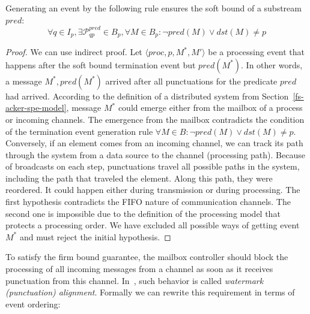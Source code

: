\begin{lemma}
Generating an event by the following rule ensures the soft bound of a substream $pred$:
\begin{equation}
\forall q \in I_p, \exists \mathcal{P}^{pred}_{qp} \in B_p, \forall M\in B_p : \neg pred(M) \vee dst(M) \ne p
\end{equation}
\end{lemma}

\begin{proof}
We can use indirect proof. Let $\langle proc, p, M^*, M' \rangle$ be a processing event that happens after the soft bound termination event but $pred(M^*)$. In other words, a message $M^*, pred(M^*)$ arrived after all punctuations for the predicate $pred$ had arrived. According to the definition of a distributed system from Section~\ref{fs-acker-spe-model}, message $M^*$ could emerge either from the mailbox of a process or incoming channels. The emergence from the mailbox contradicts the condition of the termination event generation rule $\forall M\in B : \neg pred(M) \vee dst(M) \ne p$.
Conversely, if an element comes from an incoming channel, we can track its path through the system from a data source to the channel (processing path). Because of broadcasts on each step, punctuations travel all possible paths in the system, including the path that traveled the element. Along this path, they were reordered. It could happen either during transmission or during processing. The first hypothesis contradicts the FIFO nature of communication channels. The second one is impossible due to the definition of the processing model that protects a processing order. We have excluded all possible ways of getting event $M^*$ and must reject the initial hypothesis.
\end{proof}

To satisfy the firm bound guarantee, the mailbox controller should block the processing of all incoming messages from a channel as soon as it receives punctuation from this channel. In~\cite{Carbone:2017:SMA:3137765.3137777}, such behavior is called {\em watermark (punctuation) alignment}. Formally we can rewrite this requirement in terms of event ordering:

